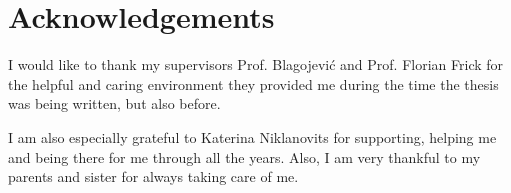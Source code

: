 \section*{Acknowledgements}
I would like to thank my supervisors Prof. Blagojevi\'c and Prof. Florian Frick for the helpful and caring environment they provided me during the time the thesis was being written, but also before.

I am also especially grateful to Katerina Niklanovits for supporting, helping me and being there for me through all the years. Also, I am very thankful to my parents and sister for always taking care of me.
